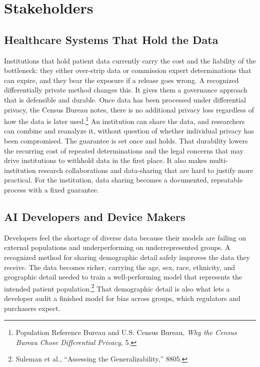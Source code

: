 \documentclass[11pt]{article}
\begin{document}
\section{Stakeholders}

\subsection{Healthcare Systems That Hold the Data}

Institutions that hold patient data currently carry the cost and the liability of the bottleneck: they either over-strip data or commission expert determinations that can expire, and they bear the exposure if a release goes wrong. A recognized differentially private method changes this. It gives them a governance approach that is defensible and durable. Once data has been processed under differential privacy, the Census Bureau notes, there is no additional privacy loss regardless of how the data is later used.\footnote{Population Reference Bureau and U.S. Census Bureau, \textit{Why the Census Bureau Chose Differential Privacy}, 5.} An institution can share the data, and researchers can combine and reanalyze it, without question of whether individual privacy has been compromised. The guarantee is set once and holds. That durability lowers the recurring cost of repeated determinations and the legal concerns that may drive institutions to withhold data in the first place. It also makes multi-institution research collaborations and data-sharing that are hard to justify more practical. For the institution, data sharing becomes a documented, repeatable process with a fixed guarantee.

\subsection{AI Developers and Device Makers}

Developers feel the shortage of diverse data because their models are failing on external populations and underperforming on underrepresented groups. A recognized method for sharing demographic detail safely improves the data they receive. The data becomes richer, carrying the age, sex, race, ethnicity, and geographic detail needed to train a well-performing model that represents the intended patient population.\footnote{Suleman et al., ``Assessing the Generalizability,'' 8805.} That demographic detail is also what lets a developer audit a finished model for bias across groups, which regulators and purchasers expect.
\end{document}
